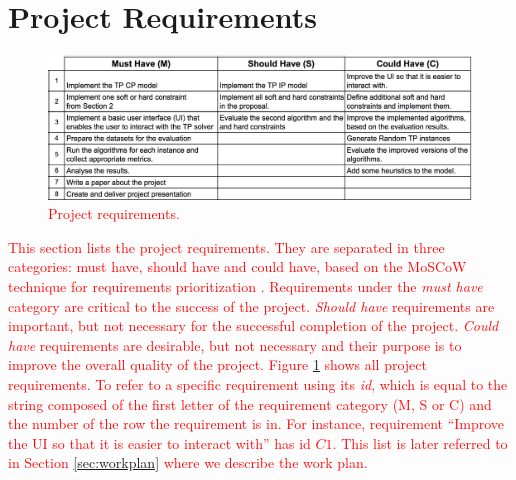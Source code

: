 \documentclass{mprop}
\theoremstyle{definition}
\begin{document}
\section{Project Requirements}
\label{sec:requirements}

\begin{figure}
\centering
\includegraphics[width = 16cm, height = 6 cm]{images/requirements.png}
\caption{\textcolor{red}{Project requirements.}}
\label{fig:requirements}
\end{figure}

\textcolor{red}{
This section lists the project requirements. They are separated in three categories: must have, should have and could have, based on the MoSCoW technique for requirements prioritization \citep{ash2007moscow}. Requirements under the \textit{must have} category are critical to the success of the project. \textit{Should have} requirements are important, but not necessary for the successful completion of the project. \textit{Could have} requirements are desirable, but not necessary and their purpose is to improve the overall quality of the project. Figure \ref{fig:requirements} shows all project requirements. To refer to a specific requirement using its \textit{id}, which is equal to the string composed of the first letter of the requirement category (M, S or C) and the number of the row the requirement is in. For instance, requirement ``Improve the UI so that it is easier to interact with'' has id $C1$. This list is later referred to in Section \ref{sec:workplan} where we describe the work plan.}
\end{document}
